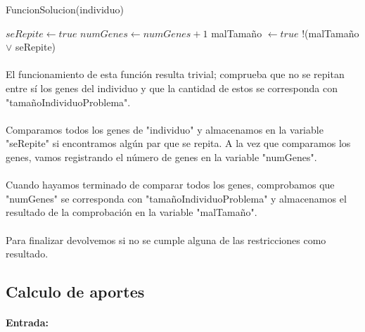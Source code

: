 	\begin{algorithm}[H]
		\caption{FuncionSolucion(individuo)}
		\begin{algorithmic}
			\STATE $seRepite \leftarrow true$
			\ENDIF
			\ENDFOR
			\STATE $numGenes \leftarrow numGenes+1$
			\ENDFOR
			\STATE malTamaño $\leftarrow true$
			\ENDIF
			\RETURN !(malTamaño $\vee$ seRepite)
		\end{algorithmic}
	\end{algorithm}

	\paragraph{}El funcionamiento de esta función resulta trivial; comprueba que no se repitan entre sí los genes del individuo y que la cantidad de estos se corresponda con "tamañoIndividuoProblema".
	
	\paragraph{}Comparamos todos los genes de "individuo" y almacenamos en la variable "seRepite" si encontramos algún par que se repita. A la vez que comparamos los genes, vamos registrando el número de genes en la variable "numGenes".
	
	\paragraph{}Cuando hayamos terminado de comparar todos los genes, comprobamos que "numGenes" se corresponda con "tamañoIndividuoProblema" y almacenamos el resultado de la comprobación en la variable "malTamaño".
	
	\paragraph{}Para finalizar devolvemos si no se cumple alguna de las restricciones como resultado.
	
	\subsection{Calculo de aportes}
	
	\paragraph{Entrada:}
	

